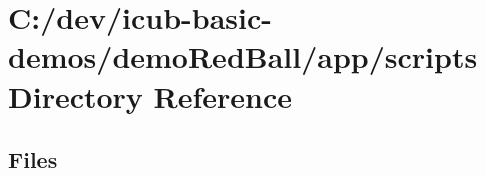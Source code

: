 \section{C\+:/dev/icub-\/basic-\/demos/demo\+Red\+Ball/app/scripts Directory Reference}
\label{dir_78c59be1348feda52106cbd20414be4b}
\subsection*{Files}
\begin{DoxyCompactItemize}
\end{DoxyCompactItemize}
